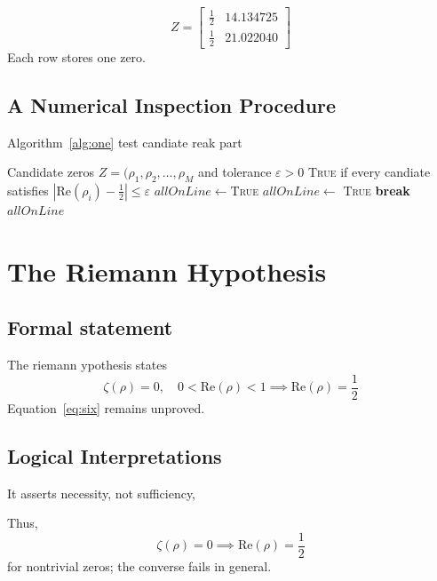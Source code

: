 \documentclass[twocolumn,10pt]{article}
\newcommand{\Real}{\text{Re}}
\begin{document}
\begin{equation}
Z = \begin{bmatrix}
    \frac{1}{2} & 14.134725 \\
    \frac{1}{2} & 21.022040
    \end{bmatrix}
\end{equation}
Each row stores one zero.
\subsection{A Numerical Inspection Procedure}
Algorithm~\ref{alg:one}
test candiate reak part
\begin{algorithm}[H]
    \caption{ Check candidate zeros against the critical line}
    \label{alg:one}
    \begin{algorithmic}[1]
        \Require Candidate zeros $Z=(\rho_1, \rho_2, \ldots , \rho_M$ and tolerance $\varepsilon > 0$
        \Ensure \textsc{True} if every candiate satisfies $|\Real(\rho_i) - \frac{1}{2}| \le \varepsilon$
        \State $allOnLine \gets $\textsc{True}
            \If{$|\Real(\rho_i) - \frac{1}{2}| > \varepsilon$}
                \State $allOnLine \gets$ \textsc{True}
                \State \textbf{break}
            \EndIf 
        \EndFor
        \State \Return $allOnLine$
    \end{algorithmic}
\end{algorithm}



    
\section{The Riemann Hypothesis}
\subsection{Formal statement}
The riemann ypothesis states
\begin{equation}
    \boxed{
    \zeta(\rho) = 0 , \quad 0 < \Real(\rho) < 1 \implies \Real(\rho) = \frac{1}{2}
    }
    \label{eq:six}
\end{equation}
Equation~\ref{eq:six} remains unproved\cite{riemann1859}.
\subsection{Logical Interpretations}
It  asserts necessity, not sufficiency,

Thus,
\[
\zeta(\rho) = 0 \implies \Real(\rho) = \frac{1}{2}
\]
for nontrivial zeros; the converse fails in general.
\end{document}
